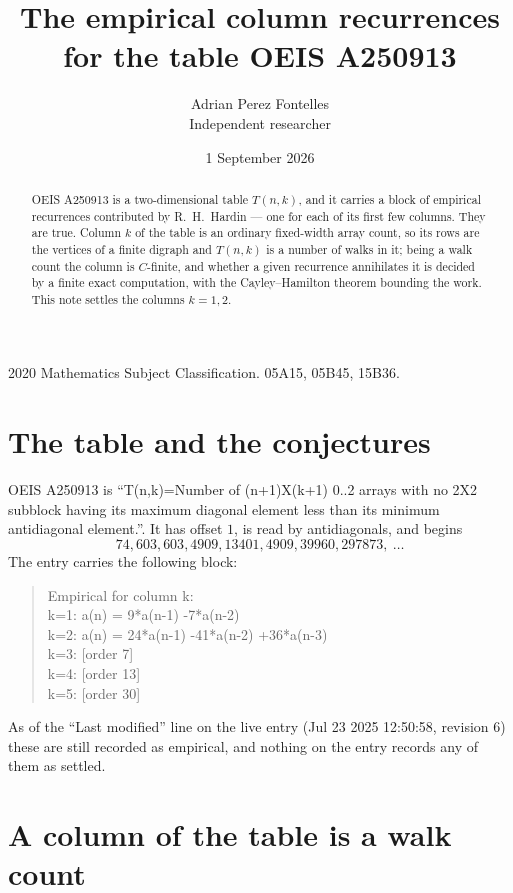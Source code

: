 \documentclass[11pt,a4paper]{article}
\title{The empirical column recurrences for the table OEIS A250913}
\author{Adrian Perez Fontelles\\ \small Independent researcher}
\date{1 September 2026}
\theoremstyle{plain}
\theoremstyle{definition}
\begin{document}
\maketitle

\begin{abstract}
OEIS A250913 is a two-dimensional table $T(n,k)$, and it carries a block of empirical
recurrences contributed by R.~H.~Hardin --- one for each of its first few columns. They are
true. Column $k$ of the table is an ordinary fixed-width array count, so its rows are the
vertices of a finite digraph and $T(n,k)$ is a number of walks in it; being a walk count the
column is $C$-finite, and whether a given recurrence annihilates it is decided by a finite
exact computation, with the Cayley--Hamilton theorem bounding the work. This note settles the columns $k=1, 2$.
\end{abstract}

\noindent\small 2020 Mathematics Subject Classification. 05A15, 05B45, 15B36.\normalsize

\section{The table and the conjectures}

OEIS A250913 is ``T(n,k)=Number of (n+1)X(k+1) 0..2 arrays with no 2X2 subblock having its maximum diagonal element less than its minimum antidiagonal element.''. It has offset $1$, is
read by antidiagonals, and begins
\[
74, 603, 603, 4909, 13401, 4909, 39960, 297873,\ \dots
\]
The entry carries the following block:
\begin{quote}\small
Empirical for column k:\\
k=1: a(n) = 9*a(n-1) -7*a(n-2)\\
k=2: a(n) = 24*a(n-1) -41*a(n-2) +36*a(n-3)\\
k=3: [order 7]\\
k=4: [order 13]\\
k=5: [order 30]\\
\end{quote}
As of the ``Last modified'' line on the live entry (Jul 23 2025 12:50:58, revision 6) these are still
recorded as empirical, and nothing on the entry records any of them as settled.

\section{A column of the table is a walk count}
\end{document}
